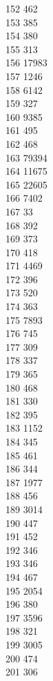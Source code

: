 { 152	462 \\
 153	385 \\
 154	380 \\
 155	313 \\
 156	17983 \\
 157	1246 \\
 158	6142 \\
 159	327 \\
 160	9385 \\
 161	495 \\
 162	468 \\
 163	79394 \\
 164	11675 \\
 165	22605 \\
 166	7402 \\
 167	33 \\
 168	392 \\
 169	373 \\
 170	418 \\
 171	4469 \\
 172	396 \\
 173	520 \\
 174	363 \\
 175	7893 \\
 176	745 \\
 177	309 \\
 178	337 \\
 179	365 \\
 180	468 \\
 181	330 \\
 182	395 \\
 183	1152 \\
 184	345 \\
 185	461 \\
 186	344 \\
 187	1977 \\
 188	456 \\
 189	3014 \\
 190	447 \\
 191	452 \\
 192	346 \\
 193	346 \\
 194	467 \\
 195	2054 \\
 196	380 \\
 197	3596 \\
 198	321 \\
 199	3005 \\
 200	474 \\
 201	306 \\
}
